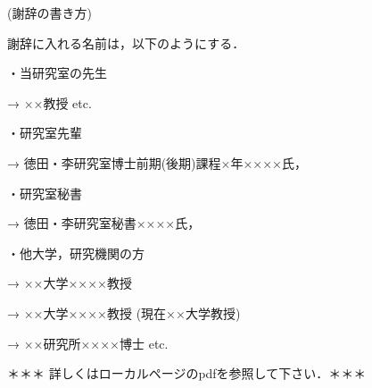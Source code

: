 (謝辞の書き方)

謝辞に入れる名前は，以下のようにする．

・当研究室の先生       

→ ××教授 etc.

・研究室先輩           

→ 徳田・李研究室博士前期(後期)課程×年××××氏，

・研究室秘書           

→ 徳田・李研究室秘書××××氏，

・他大学，研究機関の方 

→ ××大学××××教授

→ ××大学××××教授 (現在××大学教授)
                       
→ ××研究所××××博士 etc.

＊＊＊ 詳しくはローカルページのpdfを参照して下さい．＊＊＊
